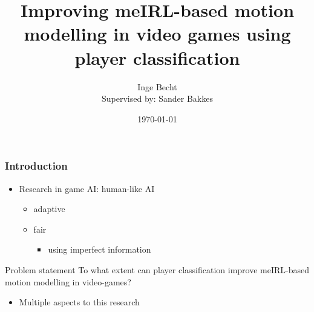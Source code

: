\documentclass{beamer}
\title[Improving meIRL-based motion modelling]{Improving meIRL-based motion modelling in video
games using player classification}
\author[Inge Becht]{Inge Becht\\{\small Supervised by: Sander Bakkes}}
\institute[Universiteit van Amsterdam]
{\large Universiteit van Amsterdam}
\date{\today}
\begin{document}
%
\begin{frame}
    \titlepage
\end{frame}

\begin{frame}
    \frametitle{Introduction}
    \begin{itemize}
        \item{Research in game AI: human-like AI}
            \begin{itemize}
                \item adaptive
                \item {\color{red}fair}
                    \begin{itemize}
                        \item using imperfect information
                    \end{itemize}
            \end{itemize}
    \end{itemize}
    \begin{block}{Problem statement}
        To what extent can player classification improve meIRL-based motion modelling
        in video-games?
    \end{block}
    \begin{itemize}
        \item Multiple aspects to this research
    \end{itemize}
\end{frame}
\end{document}
